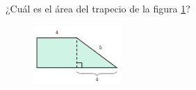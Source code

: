 ¿Cuál es el \'area del trapecio de la figura \ref{fig:area_compuesta_02}?
\begin{figure}[H]
    \begin{center}
        \includegraphics[width=0.3\textwidth]{../images/area_compuesta_02.png}
    \end{center}
    \caption{}
    \label{fig:area_compuesta_02}
\end{figure}
